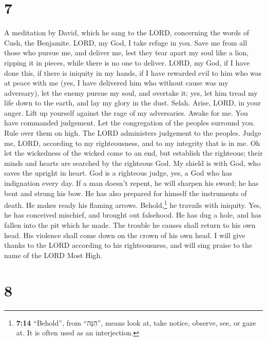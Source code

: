 \hypertarget{section-6}{%
\section{7}\label{section-6}}

A meditation by David, which he sang to the LORD, concerning the words
of Cush, the Benjamite.  LORD, my God, I take refuge in
you. Save me from all those who pursue me, and deliver me,
 lest they tear apart my soul like a lion, ripping it in
pieces, while there is no one to deliver.  LORD, my God,
if I have done this, if there is iniquity in my hands,  if
I have rewarded evil to him who was at peace with me (yes, I have
delivered him who without cause was my adversary),  let
the enemy pursue my soul, and overtake it; yes, let him tread my life
down to the earth, and lay my glory in the dust. Selah. 
Arise, LORD, in your anger. Lift up yourself against the rage of my
adversaries. Awake for me. You have commanded judgement. 
Let the congregation of the peoples surround you. Rule over them on
high.  The LORD administers judgement to the peoples.
Judge me, LORD, according to my righteousness, and to my integrity that
is in me.  Oh let the wickedness of the wicked come to an
end, but establish the righteous; their minds and hearts are searched by
the righteous God.  My shield is with God, who saves the
upright in heart.  God is a righteous judge, yes, a God
who has indignation every day.  If a man doesn't repent,
he will sharpen his sword; he has bent and strung his bow.
 He has also prepared for himself the instruments of
death. He makes ready his flaming arrows. 
Behold,\footnote{\textbf{7:14} ``Behold'', from ``הִנֵּה'', means look
  at, take notice, observe, see, or gaze at. It is often used as an
  interjection.} he travails with iniquity. Yes, he has conceived
mischief, and brought out falsehood.  He has dug a hole,
and has fallen into the pit which he made.  The trouble
he causes shall return to his own head. His violence shall come down on
the crown of his own head.  I will give thanks to the
LORD according to his righteousness, and will sing praise to the name of
the LORD Most High.

\hypertarget{section-7}{%
\section{8}\label{section-7}}

